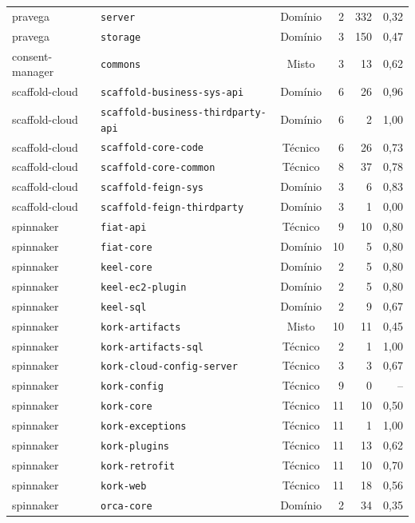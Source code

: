 \begin{quadro}[htbp]
{\begin{tabular}{llcrrr}
        pravega & \texttt{server} & Domínio & 2 & 332 & 0,32 \\
        pravega & \texttt{storage} & Domínio & 3 & 150 & 0,47 \\
        consent-manager & \texttt{commons} & Misto & 3 & 13 & 0,62 \\
        scaffold-cloud & \texttt{scaffold-business-sys-api} & Domínio & 6 & 26 & 0,96 \\
        scaffold-cloud & \texttt{scaffold-business-thirdparty-api} & Domínio & 6 & 2 & 1,00 \\
        scaffold-cloud & \texttt{scaffold-core-code} & Técnico & 6 & 26 & 0,73 \\
        scaffold-cloud & \texttt{scaffold-core-common} & Técnico & 8 & 37 & 0,78 \\
        scaffold-cloud & \texttt{scaffold-feign-sys} & Domínio & 3 & 6 & 0,83 \\
        scaffold-cloud & \texttt{scaffold-feign-thirdparty} & Domínio & 3 & 1 & 0,00 \\
        spinnaker & \texttt{fiat-api} & Técnico & 9 & 10 & 0,80 \\
        spinnaker & \texttt{fiat-core} & Domínio & 10 & 5 & 0,80 \\
        spinnaker & \texttt{keel-core} & Domínio & 2 & 5 & 0,80 \\
        spinnaker & \texttt{keel-ec2-plugin} & Domínio & 2 & 5 & 0,80 \\
        spinnaker & \texttt{keel-sql} & Domínio & 2 & 9 & 0,67 \\
        spinnaker & \texttt{kork-artifacts} & Misto & 10 & 11 & 0,45 \\
        spinnaker & \texttt{kork-artifacts-sql} & Técnico & 2 & 1 & 1,00 \\
        spinnaker & \texttt{kork-cloud-config-server} & Técnico & 3 & 3 & 0,67 \\
        spinnaker & \texttt{kork-config} & Técnico & 9 & 0 & -- \\
        spinnaker & \texttt{kork-core} & Técnico & 11 & 10 & 0,50 \\
        spinnaker & \texttt{kork-exceptions} & Técnico & 11 & 1 & 1,00 \\
        spinnaker & \texttt{kork-plugins} & Técnico & 11 & 13 & 0,62 \\
        spinnaker & \texttt{kork-retrofit} & Técnico & 11 & 10 & 0,70 \\
        spinnaker & \texttt{kork-web} & Técnico & 11 & 18 & 0,56 \\
        spinnaker & \texttt{orca-core} & Domínio & 2 & 34 & 0,35 \\
        \bottomrule
    \end{tabular}
}{
}
\end{quadro}
